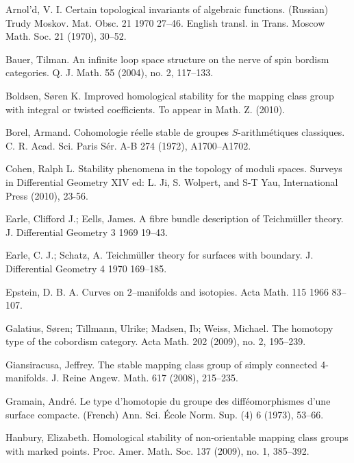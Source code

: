 \documentclass[10pt]{amsart}
\begin{document}
\begin{thebibliography}{21}

 Arnol'd, V. I.
Certain topological invariants of algebraic functions. (Russian)
Trudy Moskov. Mat. Obsc. 21 1970 27--46. English transl. in Trans. Moscow Math. Soc. 21 (1970), 30--52.

 Bauer, Tilman. An infinite loop space structure on the nerve of spin bordism categories.  Q. J. Math.  55  (2004),  no. 2, 117--133.

 Boldsen, S{\o}ren K. Improved homological stability for the
  mapping class group with integral or twisted coefficients. To appear in
  Math. Z. (2010).

 Borel, Armand.
Cohomologie r\'eelle stable de groupes $S$-arithm\'etiques classiques. 
C. R. Acad. Sci. Paris S\'er. A-B 274 (1972), A1700--A1702. 



 Cohen, Ralph L. Stability phenomena in the topology of moduli spaces. Surveys in Differential Geometry XIV ed: L. Ji, S. Wolpert, and S-T Yau, International Press (2010), 23-56.

 Earle, Clifford J.; Eells, James. 
A fibre bundle description of Teichm\"{u}ller theory.  J. Differential Geometry  3  1969 19--43. 

 Earle, C. J.; Schatz, A. Teichm\"{u}ller theory for surfaces with boundary.  J. Differential Geometry  4  1970 169--185.



 Epstein, D. B. A. Curves on $2$--manifolds and isotopies.  Acta Math.  115  1966 83--107. 



 Galatius, S{\o}ren; Tillmann, Ulrike; Madsen, Ib; Weiss, Michael. The homotopy type of the cobordism category.  Acta Math.  202  (2009),  no. 2, 195--239.

 Giansiracusa, Jeffrey. The stable mapping class group of simply connected 4-manifolds.  J. Reine Angew. Math.  617  (2008), 215--235.

 Gramain, Andr\'e. Le type d'homotopie du groupe des diff\'eomorphismes d'une surface compacte. (French)  
Ann. Sci. \'Ecole Norm. Sup. (4)  6  (1973), 53--66.

 Hanbury, Elizabeth. Homological stability of non-orientable mapping class groups with marked points.  Proc. Amer. Math. Soc.  137  (2009),  no. 1, 385--392.


\end{thebibliography}
\end{document}
